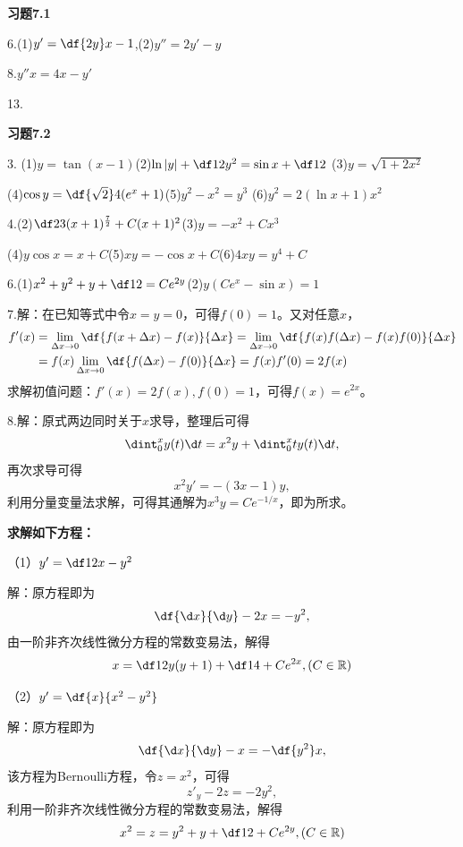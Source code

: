 
{\bf 习题7.1}

\bigskip

6.\;(1)$y'=\df{2y}x-1$,\quad (2)$y''=2y'-y$

\bigskip

8.\;$y''x=4x-y'$

\bigskip

13.



\bigskip

{\bf 习题7.2}

\bigskip

3.\; (1)$y=\tan(x-1)$\quad (2)$\ln|y|+\df12y^2=\sin x+\df12$
\quad (3)$y=\sqrt{1+2x^2}$

\quad(4)$\cos y=\df{\sqrt2}4(e^x+1)$\quad(5)$y^2-x^2=y^3$
\quad(6)$y^2=2(\ln x+1)x^2$

\bigskip

4.\;(2)$\df23(x+1)^{\frac72}+C(x+1)^2$\quad(3)$y=-x^2+Cx^3$

\quad(4)$y\cos x=x+C$\quad(5)$xy=-\cos x+C$\quad(6)$4xy=y^4+C$

\bigskip

6.\;(1)$x^2+y^2+y+\df12=Ce^{2y}$\quad (2)$y(Ce^x-\sin x)=1$

\bigskip

7.\;解：在已知等式中令$x=y=0$，可得$f(0)=1$。又对任意$x$，
\begin{align*}
	f'(x)&=\lim\limits_{\Delta x\to0}\df{f(x+\Delta x)-f(x)}{\Delta x}
	=\lim\limits_{\Delta x\to0}\df{f(x)f(\Delta x)-f(x)f(0)}{\Delta x}\\
	&=f(x)\lim\limits_{\Delta x\to0}\df{f(\Delta x)-f(0)}{\Delta x}
	=f(x)f'(0)=2f(x)
\end{align*}
求解初值问题：$f'(x)=2f(x),f(0)=1$，可得$f(x)=e^{2x}$。

\bigskip

8.\;解：原式两边同时关于$x$求导，整理后可得
$$\dint_0^xy(t)\d t=x^2y+\dint_0^xty(t)\d t,$$
再次求导可得
$$x^2y'=-(3x-1)y,$$
利用分量变量法求解，可得其通解为$x^3y=Ce^{-1/x}$，即为所求。

{\bf 求解如下方程：}

（1）$y'=\df1{2x-y^2}$

解：原方程即为
$$\df{\d x}{\d y}-2x=-y^2,$$
由一阶非齐次线性微分方程的常数变易法，解得
$$x=\df12y(y+1)+\df14+Ce^{2x},(C\in\mathbb{R})$$

（2）$y'=\df{x}{x^2-y^2}$

解：原方程即为
$$\df{\d x}{\d y}-x=-\df{y^2}x,$$
该方程为Bernoulli方程，令$z=x^2$，可得
$$z'_y-2z=-2y^2,$$
利用一阶非齐次线性微分方程的常数变易法，解得
$$x^2=z=y^2+y+\df12+Ce^{2y},(C\in\mathbb{R})$$

